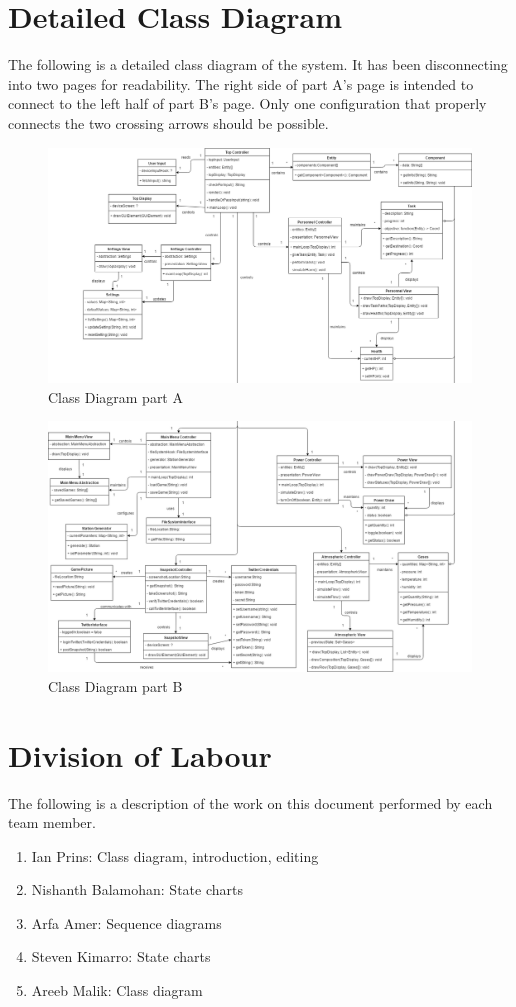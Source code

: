 \documentclass[]{article}
\begin{document}
\section{Detailed Class Diagram}
\label{sec:detailed_class_diagram}
The following is a detailed class diagram of the system. It has been disconnecting into two pages for readability. The right side of part A's page is intended to connect to the left half of part B's page. Only one configuration that properly connects the two crossing arrows should be possible.
\begin{figure}[H]
	\centering
	\includegraphics[width=220mm, angle=90]{ClassDiagramA.png}
	\caption{Class Diagram part A}
\end{figure}
\begin{figure}[H]
	\centering
	\includegraphics[width=220mm, angle=90]{ClassDiagramB.png}
	\caption{Class Diagram part B}
\end{figure}

\appendix
\section{Division of Labour}
\label{sec:division_of_labour}
The following is a description of the work on this document performed by each team member.
\begin{enumerate}
	\item Ian Prins: Class diagram, introduction, editing
	\item Nishanth Balamohan: State charts
	\item Arfa Amer: Sequence diagrams
	\item Steven Kimarro: State charts
	\item Areeb Malik: Class diagram
\end{enumerate}
\end{document}
